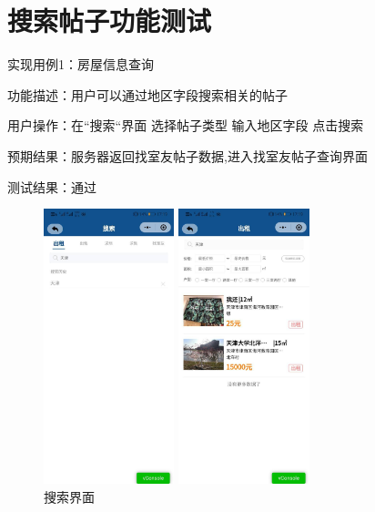 \section{搜索帖子功能测试}

实现用例1：房屋信息查询

功能描述：用户可以通过地区字段搜索相关的帖子

用户操作：在“搜索“界面 选择帖子类型 输入地区字段 点击搜索

预期结果：服务器返回找室友帖子数据,进入找室友帖子查询界面

测试结果：通过
\begin{figure}[htbp]
    \centering
    \begin{minipage}[t]{0.32\textwidth}
        \centering
        \includegraphics[width=3.8cm,height=8cm]{test/image/test19.png} 
       \caption{搜索界面} 
        \end{minipage}
    \begin{minipage}[t]{0.32\textwidth}
    \centering
    \includegraphics[width=3.8cm,height=8cm]{test/image/test20.png} 

\end{minipage}
\end{figure}
